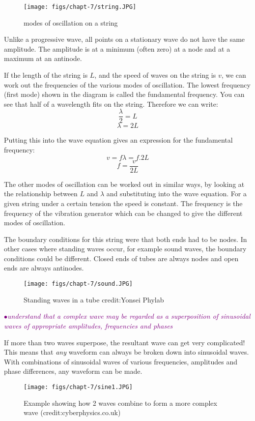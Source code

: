 \documentclass[a4paper,11pt,twoside]{memoir}
\newcounter{spec}[chapter]
\newcommand{\spec}[1]{\Needspace{5\baselineskip}\textcolor{purple}{$\bullet$\hspace{0.5cm}\textit{#1}}}
\begin{document}
\begin{figure}[h!]
\centering
\texttt{[image: figs/chapt-7/string.JPG]}
\caption{modes of oscillation on a string}
\end{figure}

Unlike a progressive wave, all points on a stationary wave do not have the same amplitude. The amplitude is at a minimum (often zero) at a node and at a maximum at an antinode.

If the length of the string is $L$, and the speed of waves on the string is $v$, we can work out the frequencies of the various modes of oscillation. The lowest frequency (first mode) shown in the diagram is called the fundamental frequency. You can see that half of a wavelength fits on the string. Therefore we can write:
$$\frac{\lambda}{2} = L$$
$$\lambda = 2L$$

Putting this into the wave equation gives an expression for the fundamental frequency:
$$v = f\lambda = f.2L$$
$$f = \frac{v}{2L}$$

The other modes of oscillation can be worked out in similar ways, by looking at the relationship between $L$ and $\lambda$ and substituting into the wave equation. For a given string under a certain tension the speed is constant. The frequency is the frequency of the vibration generator which can be changed to give the different modes of oscillation.

The boundary conditions for this string were that both ends had to be nodes. In other cases where standing waves occur, for example sound waves, the boundary conditions could be different. Closed ends of tubes are always nodes and open ends are always antinodes.

\begin{figure}[h!]
\centering
\texttt{[image: figs/chapt-7/sound.JPG]}
\caption{Standing waves in a tube {credit:Yonsei Phylab}}
\end{figure}

\spec{understand that a complex wave may be regarded as a superposition of sinusoidal waves of appropriate amplitudes, frequencies and phases}

If more than two waves superpose, the resultant wave can get very complicated! This means that \emph{any} waveform can always be broken down into sinusoidal waves. With combinations of sinusoidal waves of various frequencies, amplitudes and phase differences, any waveform can be made.

\begin{figure}[h!]
\centering
\texttt{[image: figs/chapt-7/sine1.JPG]}
\caption{Example showing how 2 waves combine to form a more complex wave (credit:cyberphysics.co.uk)}
\end{figure}
\end{document}
